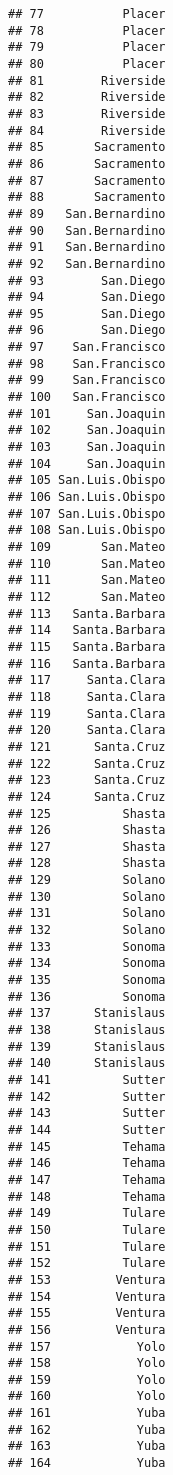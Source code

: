 \documentclass[
]{article}
\begin{document}
\begin{verbatim}
## 77           Placer
## 78           Placer
## 79           Placer
## 80           Placer
## 81        Riverside
## 82        Riverside
## 83        Riverside
## 84        Riverside
## 85       Sacramento
## 86       Sacramento
## 87       Sacramento
## 88       Sacramento
## 89   San.Bernardino
## 90   San.Bernardino
## 91   San.Bernardino
## 92   San.Bernardino
## 93        San.Diego
## 94        San.Diego
## 95        San.Diego
## 96        San.Diego
## 97    San.Francisco
## 98    San.Francisco
## 99    San.Francisco
## 100   San.Francisco
## 101     San.Joaquin
## 102     San.Joaquin
## 103     San.Joaquin
## 104     San.Joaquin
## 105 San.Luis.Obispo
## 106 San.Luis.Obispo
## 107 San.Luis.Obispo
## 108 San.Luis.Obispo
## 109       San.Mateo
## 110       San.Mateo
## 111       San.Mateo
## 112       San.Mateo
## 113   Santa.Barbara
## 114   Santa.Barbara
## 115   Santa.Barbara
## 116   Santa.Barbara
## 117     Santa.Clara
## 118     Santa.Clara
## 119     Santa.Clara
## 120     Santa.Clara
## 121      Santa.Cruz
## 122      Santa.Cruz
## 123      Santa.Cruz
## 124      Santa.Cruz
## 125          Shasta
## 126          Shasta
## 127          Shasta
## 128          Shasta
## 129          Solano
## 130          Solano
## 131          Solano
## 132          Solano
## 133          Sonoma
## 134          Sonoma
## 135          Sonoma
## 136          Sonoma
## 137      Stanislaus
## 138      Stanislaus
## 139      Stanislaus
## 140      Stanislaus
## 141          Sutter
## 142          Sutter
## 143          Sutter
## 144          Sutter
## 145          Tehama
## 146          Tehama
## 147          Tehama
## 148          Tehama
## 149          Tulare
## 150          Tulare
## 151          Tulare
## 152          Tulare
## 153         Ventura
## 154         Ventura
## 155         Ventura
## 156         Ventura
## 157            Yolo
## 158            Yolo
## 159            Yolo
## 160            Yolo
## 161            Yuba
## 162            Yuba
## 163            Yuba
## 164            Yuba
\end{verbatim}
\end{document}
